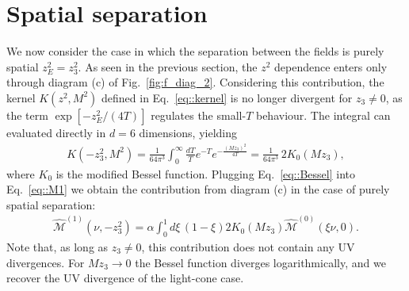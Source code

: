 \section{Spatial separation}
\label{sec:spatial-separtaion}

We now consider the case in which the separation between the fields is purely
spatial $z_E^2 = z_3^2$. As seen in the previous section, the $z^2$ dependence
enters only through diagram (c) of Fig.~\ref{fig:f_diag_2}. Considering this
contribution, the kernel $K\left(z^2,M^2\right) $ defined in
Eq.~\eqref{eq::kernel} is no longer divergent for $z_3\neq 0$, as the term
$\exp\left[-z_E^2/(4T)\right]$ regulates the small-$T$ behaviour. The integral
can evaluated directly in $d=6$ dimensions, yielding
\begin{align}
    \label{eq::Bessel}
    K\left(-z_3^2, M^2\right) = 
    \frac{1}{64\pi^3}\int_0^{\infty}\frac{dT}{T} e^{-T} e^{-\frac{\left(M z_3\right)^2}{4T}} =\frac{1}{64\pi^3}\, 2K_0\left(M z_3\right),
\end{align}
where $K_0$ is the modified Bessel function. Plugging Eq.~\eqref{eq::Bessel} into Eq.~\eqref{eq::M1} we obtain the contribution from diagram (c) in the case of purely spatial separation:
\begin{align}
\label{eq::1loopcont}
    \widehat{\mathcal{M}}^{(1)}\left(\nu, -z_3^2\right) = 
    \alpha\int_0^{1} d\xi \, \left(1-\xi\right) 2K_0\left(M z_3\right)\widehat{\mathcal{M}}^{(0)}\left(\xi\nu, 0\right) .
\end{align}
Note that, as long as $z_3 \neq 0$, this contribution does not contain any UV
divergences. For $M z_3 \rightarrow 0$ the Bessel function diverges
logarithmically, and we recover the UV divergence of the light-cone case.

